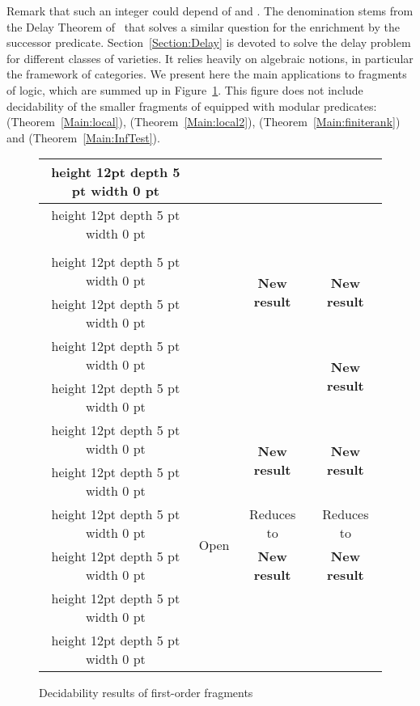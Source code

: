 \documentclass[submission,hidelink]{dmtcs-episciences}
\newcommand{\tvi}{\vrule height 12pt depth 5 pt width 0 pt}
\begin{document}
\noindent
Remark that such an integer  could depend of  and . The denomination stems from the Delay Theorem of~\cite{Straubing85} that solves a similar question for the enrichment
by the
successor predicate.
Section~\ref{Section:Delay} is devoted to solve the delay problem for different classes of varieties.
It relies heavily on algebraic notions, in particular the framework of categories.
We present here the main applications to fragments of logic, which are summed up in Figure~\ref{TableauFinal}.
This figure does not include decidability of the smaller fragments of  equipped with modular predicates:  (Theorem~\ref{Main:local}),  (Theorem~\ref{Main:local2}),  (Theorem~\ref{Main:finiterank}) and  (Theorem~\ref{Main:InfTest}).
\newcommand{\newresult}{\multirow{2}{60pt}{\textbf{New result}}}
\begin{figure}

\centering

\begin{tabular}{|c|c|c|c|}
\hline
\tvi &  &  &  \\
\hline 
\tvi \multirow{2}{60pt}{ } & \cite{SI75} & \multirow{2}{110pt}{\cite{CPS06b}}& \multirow{2}{100pt}{ \cite{MPT00}} \\
&\cite{TO82}&&\\
 \hline
\tvi \multirow{2}{60pt}{ } & \cite{KS12} &  \newresult &  \newresult\\
\tvi & \cite{KW12} & & \\
 \hline
 
 \tvi \multirow{2}{60pt}{\hfil } &  \multirow{2}{120pt}{\cite{TW98}} & \multirow{2}{130pt}{\cite{DP13}} &\newresult \\
 \tvi & & & \\
 \hline
 
  \tvi \multirow{2}{60pt}{\hfil } &  \multirow{2}{110pt}{\cite{PZ14}} & \newresult & \newresult \\
  \tvi & & & \\
 \hline
 
 \tvi \multirow{2}{60pt}{\hfil } & \multirow{2}{40pt}{Open }& Reduces to  & Reduces to \\
\tvi & & \textbf{New result}& \textbf{New result} \\
\hline 

 \tvi \multirow{2}{60pt}{\hfil } & \cite{MP71} &   \multirow{2}{75pt}{\cite{Straubing94}}  &  \multirow{2}{110pt}{\cite{Bar92}} \\
\tvi & \cite{Schutzenberger65} &  & \\
\hline 
\end{tabular}
\caption{Decidability results of first-order fragments}\label{TableauFinal}
\end{figure}
\end{document}
